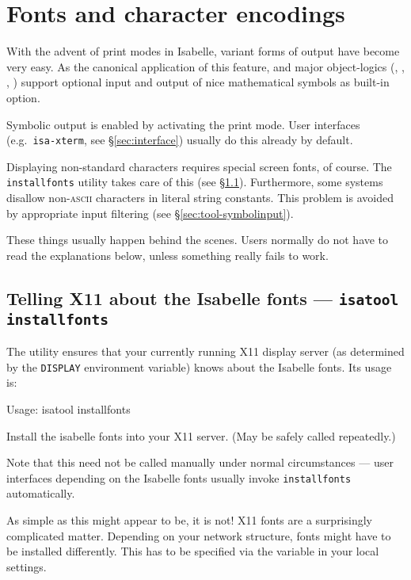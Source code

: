 

\chapter{Fonts and character encodings}

With the advent of print modes in Isabelle, variant forms of output
have become very easy. As the canonical application of this feature,
{\Pure} and major object-logics (\FOL, \ZF, \HOL, \HOLCF) support
optional input and output of nice mathematical symbols as built-in
option.

Symbolic output is enabled by activating the  print
mode. User interfaces (e.g.\ \texttt{isa-xterm}, see
\S\ref{sec:interface}) usually do this already by default.

\medskip Displaying non-standard characters requires special screen
fonts, of course. The \texttt{installfonts} utility takes care of this
(see \S\ref{sec:tool-installfonts}). Furthermore, some {\ML} systems
disallow non-\textsc{ascii} characters in literal string constants.
This problem is avoided by appropriate input filtering (see
\S\ref{sec:tool-symbolinput}).

These things usually happen behind the scenes.  Users normally do not
have to read the explanations below, unless something really fails to
work.


\section{Telling X11 about the Isabelle fonts --- \texttt{isatool installfonts}}
\label{sec:tool-installfonts}

The  utility ensures that your currently running
X11 display server (as determined by the \texttt{DISPLAY} environment
variable) knows about the Isabelle fonts. Its usage is:
\begin{ttbox}
Usage: isatool installfonts

  Install the isabelle fonts into your X11 server.
  (May be safely called repeatedly.)
\end{ttbox}
Note that this need not be called manually under normal circumstances
--- user interfaces depending on the Isabelle fonts usually invoke
\texttt{installfonts} automatically.

\medskip As simple as this might appear to be, it is not! X11 fonts
are a surprisingly complicated matter. Depending on your network
structure, fonts might have to be installed differently. This has to
be specified via the  variable in your
local settings.

